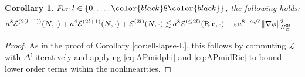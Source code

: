 \documentclass[11pt,leqno,textwidth=10cm]{amsart}
\numberwithin{equation}{section}
\theoremstyle{definition}
\theoremstyle{plain}
\newtheorem{corollary}[definition]{Corollary}
\newcommand{\1}{\mathbbm{1}}
\newcommand{\E}{\mathcal{E}}
\renewcommand{\L}{\mathcal{L}}
\newcommand{\Ric}{\text{\normalfont{Ric}}}
\renewcommand{\epsilon}{\varepsilon}
\newcommand{\Lap}{\Delta}
\newcommand{\Ltilde}{\tilde{\L}}
\newcommand{\change}[1]{\color{black}#1\color{black}}
\begin{document}
\begin{corollary}For $l\in\{0,\dots,\change{8}\}$, the following holds:
\label{cor:en-est-lapse-tilde}
\begin{align*}
a^8\E^{(2(l+1))}(N,\cdot)+a^4\E^{(2l+1)}(N,\cdot)+\E^{(2l)}(N,\cdot)\lesssim&\,a^8\E^{(\leq 2l)}(\Ric,\cdot)+{\epsilon}a^{8-c\sqrt{\epsilon}}\|\nabla\phi\|_{H^{2l}_G}^2
\end{align*}
\end{corollary}
\begin{proof} As in the proof of Corollary \ref{cor:ell-lapse-L}, this follows by commuting $\Ltilde$ with $\Lap^l$ iteratively and applying \eqref{eq:APmidphi} and \eqref{eq:APmidRic} to bound lower order terms within the nonlinearities.
\end{proof}
\end{document}
